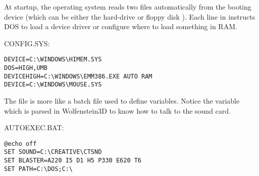 \documentclass[book.tex]{subfiles}
\begin{document}
At startup, the operating system reads two files automatically from the booting device (which can be either the hard-drive  or floppy disk ). Each line 
in  instructs DOS to load a device driver or configure where to load something in RAM.\\ 
\par
CONFIG.SYS:\\
 \begin{lstlisting}[breaklines=true,breakindent=0em]
DEVICE=C:\WINDOWS\HIMEM.SYS
DOS=HIGH,UMB
DEVICEHIGH=C:\WINDOWS\EMM386.EXE AUTO RAM
DEVICE=C:\WINDOWS\MOUSE.SYS
\end{lstlisting}
\par
The file  is more like a batch file used to define variables. Notice the  variable which is parsed in Wolfenstein3D to know how to talk to the sound card.\\
\par
AUTOEXEC.BAT:\\
 \begin{lstlisting}[breaklines=true,breakindent=0em]
@echo off
SET SOUND=C:\CREATIVE\CTSND
SET BLASTER=A220 I5 D1 H5 P330 E620 T6
SET PATH=C:\DOS;C:\ 
\end{lstlisting}
\end{document}
